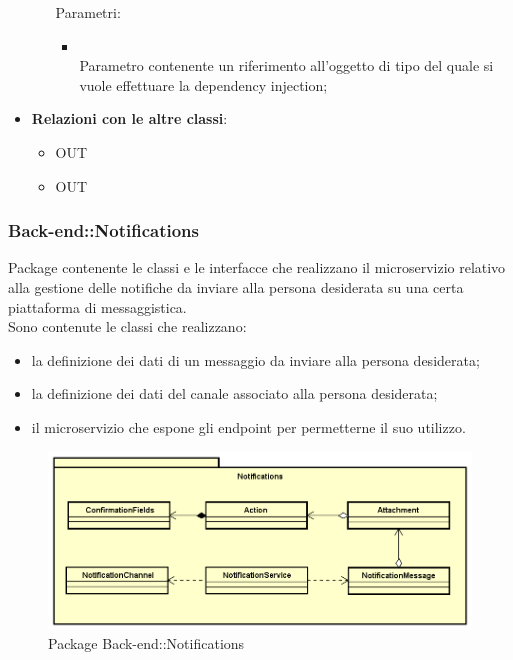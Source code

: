 \begin{itemize}
\begin{itemize}
		Parametri:
		\begin{itemize}
			\item {} \\
			Parametro contenente un riferimento all'oggetto di tipo  del quale si vuole effettuare la dependency injection;
		\end{itemize}
	\end{itemize}
	\item \textbf{Relazioni con le altre classi}:
	\begin{itemize}
		\item OUT \hyperlink{Member_label}{}
		\item OUT \hyperlink{ErrorObservable_label}{}
	\end{itemize}
\end{itemize}
\FloatBarrier
\newpage
\subsubsection{Back-end::Notifications}
Package contenente le classi e le interfacce che realizzano il microservizio relativo alla gestione delle notifiche da inviare alla persona desiderata su una certa piattaforma di messaggistica.\\
Sono contenute le classi che realizzano:
\begin{itemize}
\item la definizione dei dati di un messaggio da inviare alla persona desiderata;
\item la definizione dei dati del canale associato alla persona desiderata;
\item il microservizio che espone gli endpoint per permetterne il suo utilizzo.
\end{itemize}
\begin{figure}[h] \centering \includegraphics[width=\textwidth,height=\textheight,keepaspectratio]{images/diagrams/back-end/Official_Backend_0304/Notifications.png}
	\caption{Package Back-end::Notifications}
\end{figure}


